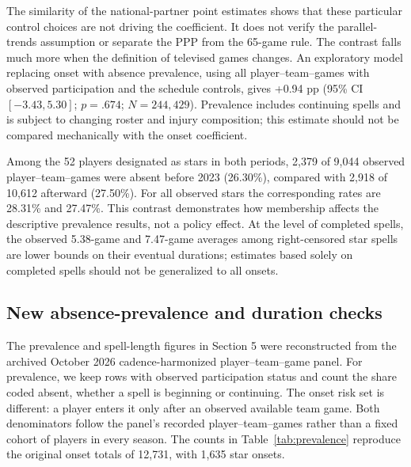 \documentclass[11pt]{article}
\begin{document}
The similarity of the national-partner point estimates shows that these particular control choices are not driving the coefficient. It does not verify the parallel-trends assumption or separate the PPP from the 65-game rule. The contrast falls much more when the definition of televised games changes. An exploratory model replacing onset with absence prevalence, using all player--team--games with observed participation and the schedule controls, gives +0.94 pp (95\% CI $[-3.43,5.30]$; $p=.674$; $N=244{,}429$). Prevalence includes continuing spells and is subject to changing roster and injury composition; this estimate should not be compared mechanically with the onset coefficient.

Among the 52 players designated as stars in both periods, 2,379 of 9,044 observed player--team--games were absent before 2023 (26.30\%), compared with 2,918 of 10,612 afterward (27.50\%). For all observed stars the corresponding rates are 28.31\% and 27.47\%. This contrast demonstrates how membership affects the descriptive prevalence results, not a policy effect. At the level of completed spells, the observed 5.38-game and 7.47-game averages among right-censored star spells are lower bounds on their eventual durations; estimates based solely on completed spells should not be generalized to all onsets.

\FloatBarrier

\subsection{New absence-prevalence and duration checks}\label{app:durationaudit}

The prevalence and spell-length figures in Section 5 were reconstructed from the archived October 2026 cadence-harmonized player--team--game panel. For prevalence, we keep rows with observed participation status and count the share coded absent, whether a spell is beginning or continuing. The onset risk set is different: a player enters it only after an observed available team game. Both denominators follow the panel's recorded player--team--games rather than a fixed cohort of players in every season. The counts in Table~\ref{tab:prevalence} reproduce the original onset totals of 12,731, with 1,635 star onsets.
\end{document}
